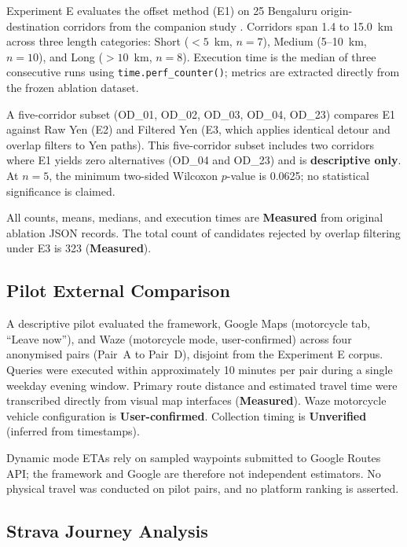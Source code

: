 \documentclass[11pt,conference]{IEEEtran}
\begin{document}
Experiment E evaluates the offset method (E1) on 25 Bengaluru origin-destination corridors from the companion study \cite{anirudhr2026turnaware}.
Corridors span 1.4 to 15.0~km across three length categories: Short ($<5$~km, $n=7$), Medium (5--10~km, $n=10$), and Long ($>10$~km, $n=8$).
Execution time is the median of three consecutive runs using \texttt{time.perf\_counter()}; metrics are extracted directly from the frozen ablation dataset.

A five-corridor subset (OD\_01, OD\_02, OD\_03, OD\_04, OD\_23) compares E1 against Raw Yen (E2) and Filtered Yen (E3, which applies identical detour and overlap filters to Yen paths).
This five-corridor subset includes two corridors where E1 yields zero alternatives (OD\_04 and OD\_23) and is \textbf{descriptive only}.
At $n=5$, the minimum two-sided Wilcoxon $p$-value is 0.0625; no statistical significance is claimed.

All counts, means, medians, and execution times are \textbf{Measured} from original ablation JSON records.
The total count of candidates rejected by overlap filtering under E3 is 323 (\textbf{Measured}).

\subsection{Pilot External Comparison}
\label{sec:methPilot}

A descriptive pilot evaluated the framework, Google Maps (motorcycle tab, ``Leave now''), and Waze (motorcycle mode, user-confirmed) across four anonymised pairs (Pair~A to Pair~D), disjoint from the Experiment E corpus.
Queries were executed within approximately 10 minutes per pair during a single weekday evening window.
Primary route distance and estimated travel time were transcribed directly from visual map interfaces (\textbf{Measured}).
Waze motorcycle vehicle configuration is \textbf{User-confirmed}.
Collection timing is \textbf{Unverified} (inferred from timestamps).

Dynamic mode ETAs rely on sampled waypoints submitted to Google Routes API; the framework and Google are therefore not independent estimators.
No physical travel was conducted on pilot pairs, and no platform ranking is asserted.

\subsection{Strava Journey Analysis}
\label{sec:methStrava}
\end{document}
